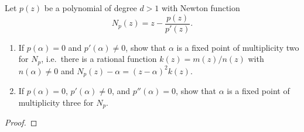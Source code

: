 \begin{problem}{5}
  Let $p(z)$ be a polynomial of degree $d > 1$ with Newton function
  $$\displaystyle N_p(z) = z - \frac{p(z)}{p'(z)}.$$
  \begin{enumerate}
    \item If $p(\alpha) = 0$ and $p'(\alpha) \neq 0$, show that $\alpha$ is a fixed point
      of multiplicity two for $N_p$, i.e.\ there is a rational function $k(z) = m(z) / n(z)$ with
      $n(\alpha) \neq 0$ and $N_p(z) - \alpha = (z-\alpha)^2 k(z)$.
    \item If $p(\alpha) = 0$, $p'(\alpha) \neq 0$, and $p''(\alpha) = 0$, show that $\alpha$
      is a fixed point of multiplicity three for $N_p$.
  \end{enumerate}
\end{problem}

\begin{proof}
\end{proof}
\newpage
